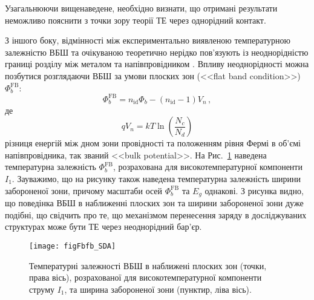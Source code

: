 Узагальнюючи вищенаведене, необхідно визнати, що отримані результати неможливо пояснити з точки зору теорії ТЕ через однорідний контакт.


З іншого боку, відмінності між експериментально виявленою температурною залежністю ВБШ та очікуваною теоретично нерідко
пов'язують із неоднорідністю границі розділу між металом та напівпровідником \cite{Dokme}.
Впливу неоднорідності можна позбутися розглядаючи ВБШ за умови плоских зон (<<flat band condition>>) $\Phi_{b}^\mathrm{FB}$:
\begin{equation}
\label{eqFbfb}
\Phi_{b}^\mathrm{FB}=n_\mathrm{id}\Phi_{b}-(n_\mathrm{id}-1)V_n\,,
\end{equation}
де
\begin{equation}
\label{eqVn}
qV_n=kT\ln\left(\frac{N_c}{N_d}\right)
\end{equation}
різниця енергій між дном зони провідності та положенням рівня Фермі в об'ємі напівпровідника,
так званий <<bulk potential>>.
На Рис.~\ref{figFbfb_SDA} наведена температурна залежність $\Phi_{b}^\mathrm{FB}$, розрахована для високотемпературної компоненти $I_1$.
Зауважимо, що на рисунку також наведена температурна залежність ширини забороненої зони, причому
масштаби осей $\Phi_{b}^\mathrm{FB}$ та $E_g$ однакові.
З рисунка видно, що поведінка ВБШ в наближенні плоских зон та ширини забороненої зони дуже подібні,
що свідчить про те, що механізмом перенесення заряду в досліджуваних структурах може бути ТЕ через неоднорідний бар'єр.


\begin{figure}
\center
\texttt{[image: figFbfb\_SDA]}
\caption{\label{figFbfb_SDA}
Температурні залежності ВБШ в наближені плоских зон (точки, права вісь), розрахованої
для високотемпературної компоненти струму $I_1$, та ширина забороненої зони (пунктир, ліва вісь).
}%
\end{figure}

